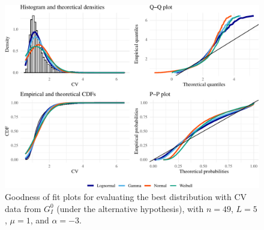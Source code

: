 \documentclass[remotesensing,article,submit,moreauthors,pdftex]{Definitions/mdpi}
\providecommand{\DIFaddbeginFL}{} %
\providecommand{\DIFaddendFL}{} %
\providecommand{\DIFdelbeginFL}{} %
\providecommand{\DIFdelendFL}{} %
\newcommand{\DIFscaledelfig}{0.5}
\newlength{\DIFdelgraphicswidth} %
\newlength{\DIFdelgraphicsheight} %
\newcommand{\DIFaddincludegraphics}[2][]{{\color{blue}\fbox{\DIFOincludegraphics[#1]{#2}}}} %
\newcommand{\DIFdelincludegraphics}[2][]{%
\sbox{\DIFdelgraphicsbox}{\DIFOincludegraphics[#1]{#2}}%
\settoboxwidth{\DIFdelgraphicswidth}{\DIFdelgraphicsbox} %
\settoboxtotalheight{\DIFdelgraphicsheight}{\DIFdelgraphicsbox} %
\scalebox{\DIFscaledelfig}{%
\parbox[b]{\DIFdelgraphicswidth}{\usebox{\DIFdelgraphicsbox}\\[-\baselineskip] \rule{\DIFdelgraphicswidth}{0em}}\llap{\resizebox{\DIFdelgraphicswidth}{\DIFdelgraphicsheight}{%
\setlength{\unitlength}{\DIFdelgraphicswidth}%
\begin{picture}(1,1)%
\thicklines\linethickness{2pt} %
{\color[rgb]{1,0,0}\put(0,0){\framebox(1,1){}}}%
{\color[rgb]{1,0,0}\put(0,0){\line( 1,1){1}}}%
{\color[rgb]{1,0,0}\put(0,1){\line(1,-1){1}}}%
\end{picture}%
}\hspace*{3pt}}} %
} %
\DeclareRobustCommand{\DIFaddbeginFL}{\DIFOaddbeginFL \let\includegraphics\DIFaddincludegraphics} %
\DeclareRobustCommand{\DIFaddendFL}{\DIFOaddendFL \let\includegraphics\DIFOincludegraphics} %
\DeclareRobustCommand{\DIFdelbeginFL}{\DIFOdelbeginFL \let\includegraphics\DIFdelincludegraphics} %
\DeclareRobustCommand{\DIFdelendFL}{\DIFOaddendFL \let\includegraphics\DIFOincludegraphics} %
\begin{document}
\begin{figure}[H]

{\centering \DIFdelbeginFL %
\DIFdelendFL \DIFaddbeginFL \includegraphics[width=1\linewidth]{R1-Identifying-Heterogeneity-in-SAR-Data-with-New-Test-Statistics_files/figure-latex/Plot_cv-1} 
\DIFaddendFL 

}

\caption{Goodness of fit plots for evaluating the best distribution with $\text{CV}$ data from $G_I^0$ (under the alternative hypothesis), with  $n=49$, $L=5$, $\mu=1$, and $\alpha=-3$.}\label{fig:Plot_cv}
\end{figure}
\end{document}
